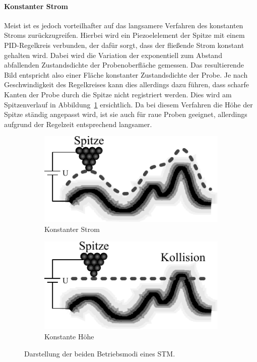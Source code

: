 \documentclass[a4paper,twoside,final]{article}
\begin{document}
\paragraph{Konstanter Strom} Meist ist es jedoch vorteilhafter auf das langsamere Verfahren des konstanten Stroms zurückzugreifen. Hierbei wird ein Piezoelelement der Spitze mit einem PID-Regelkreis verbunden, der dafür sorgt, dass der fließende Strom konstant gehalten wird. Dabei wird die Variation der exponentiell zum Abstand abfallenden Zustandsdichte der Probenoberfläche gemessen. Das resultierende Bild entspricht also einer Fläche konstanter Zustandsdichte der Probe. Je nach Geschwindigkeit des Regelkreises kann dies allerdings dazu führen, dass scharfe Kanten der Probe durch die Spitze nicht registriert werden. Dies wird am Spitzenverlauf in Abbildung~\ref{fig:Betriebsmodi} ersichtlich. Da bei diesem Verfahren die Höhe der Spitze ständig angepasst wird, ist sie auch für raue Proben geeignet, allerdings aufgrund der Regelzeit entsprechend langsamer.
\begin{figure}[htp]
    \centering
    \begin{subfigure}{0.45\textwidth}
        \includegraphics{Bilder/STM_konstStrom.pdf}
        \caption{Konstanter Strom}
    \end{subfigure}
    \hspace{1cm}
    \begin{subfigure}{0.45\textwidth}
        \includegraphics{Bilder/STM_konstHoehe.pdf}
        \caption{Konstante Höhe}
    \end{subfigure}
    \caption{Darstellung der beiden Betriebsmodi eines STM.}
    \label{fig:Betriebsmodi}
\end{figure}
\end{document}
